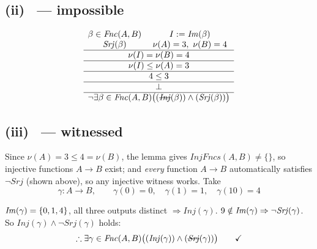\documentclass[11pt]{article}
\newcommand{\op}[1]{\mathit{#1}}
\newcommand{\Fnc}{\op{Fnc}} \newcommand{\Inj}{\op{Inj}} \newcommand{\Srj}{\op{Srj}}
\newcommand{\InjFncs}{\op{InjFncs}} \newcommand{\SrjFncs}{\op{SrjFncs}}
\newcommand{\circy}{\fbox{Y}} \newcommand{\circn}{\fbox{N}}
\newcommand{\seclabel}[1]{\noindent\fbox{\textbf{#1}}\par\smallskip}
\begin{document}
\subsection*{(ii) \circn\ --- impossible}
\seclabel{2a.ii}
\[
\begin{array}{cc}
\beta\in\Fnc(A,B) & I:=\Img(\beta)\\
\Srj(\beta) & \nu(A)=3,\ \nu(B)=4\\
\hline
\multicolumn{2}{c}{\nu(I)=\nu(B)=4}\\
\hline
\multicolumn{2}{c}{\nu(I)\le\nu(A)=3}\\
\hline
\multicolumn{2}{c}{4\le3}\\
\hline
\multicolumn{2}{c}{\bot}\\
\hline
\multicolumn{2}{c}{\neg\exists\beta\in\Fnc(A,B)\big((\text{\sout{\textit{Inj}}}(\beta))\wedge(\Srj(\beta))\big)}
\end{array}
\]

\subsection*{(iii) \circy\ --- witnessed}
\seclabel{2a.iii}
Since $\nu(A)=3\le4=\nu(B)$, the lemma gives $\InjFncs(A,B)\ne\{\}$, so injective functions $A\to B$ exist; and \emph{every} function $A\to B$ automatically satisfies $\neg\Srj$ (shown above), so any injective witness works. Take
\[
\gamma:A\to B,\qquad \gamma(0)=0,\quad \gamma(1)=1,\quad \gamma(10)=4
\]
\begin{center}
\end{center}
$\Img(\gamma)=\{0,1,4\}$, all three outputs distinct $\Rightarrow \Inj(\gamma)$. $9\notin\Img(\gamma) \Rightarrow \neg\Srj(\gamma)$. So $\Inj(\gamma)\wedge\neg\Srj(\gamma)$ holds:
\[
\therefore \exists\gamma\in\Fnc(A,B)\big((\Inj(\gamma))\wedge(\text{\sout{\textit{Srj}}}(\gamma))\big) \qquad\checkmark
\]
\end{document}
